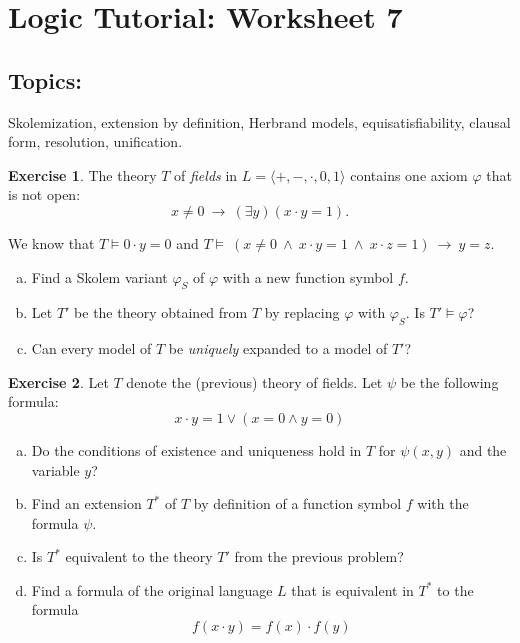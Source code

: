 \documentclass[11pt,a4paper]{amsart}
\theoremstyle{definition}
\newtheorem{problem}{Exercise}
\theoremstyle{remark}
\begin{document}
\section*{ Logic Tutorial: Worksheet 7}

\bigskip
\subsection*{Topics:} Skolemization, extension by definition, Herbrand models, equisatisfiability, clausal form, resolution, unification.

\bigskip


\begin{problem} The theory $T$ of \emph{fields} in $L=\langle +,-,\cdot,0,1\rangle$ contains one axiom $\varphi$ that is not open:
$$x\ne 0\ \to\ (\exists y)(x\cdot y=1).$$
\medskip

We know that $T\models 0\cdot y=0$ and $T\models\ (x\ne 0\ \wedge\ x\cdot y=1\ \wedge\ x\cdot z=1)\ \to\ y=z$.
\medskip
\begin{enumerate}[(a)]
\itemsep12pt
\item Find a Skolem variant $\varphi_S$ of $\varphi$ with a new function symbol $f$.
\item Let $T'$ be the theory obtained from $T$ by replacing $\varphi$ with $\varphi_S$. Is $T' \models \varphi$?
\item Can every model of $T$ be \emph{uniquely} expanded to a model of $T'$?
\end{enumerate}
\end{problem}

\bigskip

\begin{problem} Let $T$ denote the (previous) theory of fields. Let $\psi$ be the following formula: $$x\cdot y=1\vee  (x=0 \wedge y=0)$$
\begin{enumerate}[(a)]
\itemsep12pt
\item Do the conditions of existence and uniqueness hold in $T$ for $\psi(x,y)$ and the variable $y$?
\item Find an extension $T^*$ of $T$ by definition of a function symbol $f$ with the formula $\psi$.
\item Is $T^*$ equivalent to the theory $T'$ from the previous problem?
\item Find a formula of the original language $L$ that is equivalent in $T^*$ to the formula
$$f(x\cdot y)=f(x)\cdot f(y)$$
\end{enumerate}
\end{problem}
\end{document}
